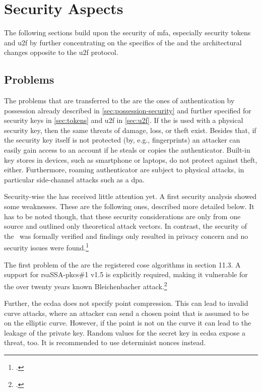 \section{Security Aspects}

The following sections build upon the security of \gls{mfa}, especially security tokens and \gls{u2f} by further concentrating on the specifics of the \wa{} and the architectural changes opposite to the \gls{u2f} protocol.

\subsection{Problems}

The problems that are transferred to the \wa{} are the ones of authentication by possession already described in \autoref{sec:possession-security} and further specified for security keys in \autoref{sec:tokens} and \gls{u2f} in \autoref{sec:u2f}. If the \wa{} is used with a physical security key, then the same threats of damage, loss, or theft exist. Besides that, if the security key itself is not protected (by, e.g., fingerprints) an attacker can easily gain access to an account if he steals or copies the authenticator. Built-in key stores in devices, such as smartphone or laptops, do not protect against theft, either. Furthermore, roaming authenticator are subject to physical attacks, in particular side-channel attacks such as a \gls{dpa}.

Security-wise the \wa{} has received little attention yet. A first security analysis showed some weaknesses. These are the following ones, described more detailed below. It has to be noted though, that these security considerations are only from one source and outlined only theoretical attack vectors. In contrast, the security of the \wa{} was formally verified and findings only resulted in privacy concern and no security issues were found.\footcites[See][]{paragon-webauth}[See][9]{FormalVerificationWebAuthn}

The first problem of the \wa{} are the registered \gls{cose} algorithms in section 11.3. A support for \gls{rsa}SSA-\gls{pkcs}\#1 v1.5 is explicitly required, making it vulnerable for the over twenty years known \frqq Bleichenbacher attack\flqq.\footcites[See][]{10.1007/BFb0055716}

Further, the \gls{ecdaa} does not specify point compression. This can lead to invalid curve attacks, where an attacker can send a chosen point that is assumed to be on the elliptic curve. However, if the point is not on the curve it can lead to the leakage of the private key. Random values for the secret key in \gls{ecdsa} expose a threat, too. It is recommended to use determinist \glspl{nonce} instead.

